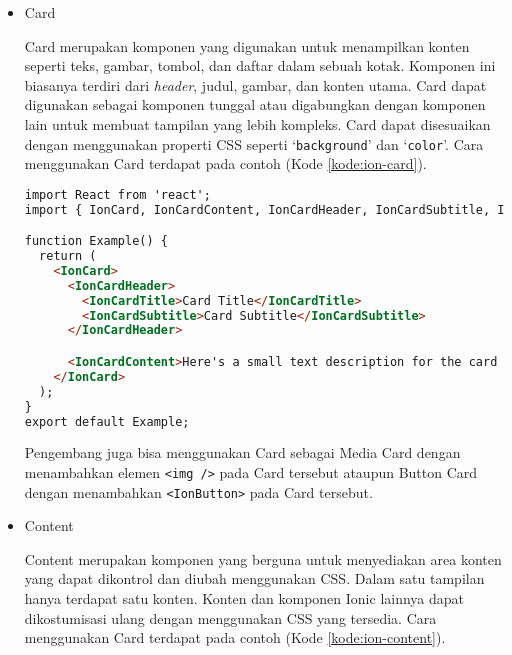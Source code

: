 \documentclass[a4paper,twoside]{article}
\begin{document}
\begin{enumerate}
\begin{itemize}
\begin{itemize}
\begin{lstlisting}[language=HTML, caption=Contoh Potongan Kode Button Menggunakan Icon, label=kode:ion-button-icon]
<IonButton>
    <IonIcon slot="start" icon={star}></IonIcon>
    Left Icon
</IonButton>
\end{lstlisting}

Nilai dari `slot' dapat berupa `\texttt{start}' untuk menempatkan ikon di awal Button, `\texttt{end}' untuk menempatkan ikon di akhir button, ataupun `\texttt{icon-only}' untuk memberikan ikon saja pada button.

        \item Card

        Card merupakan komponen yang digunakan untuk menampilkan konten seperti teks, gambar, tombol, dan daftar dalam sebuah kotak. Komponen ini biasanya terdiri dari \textit{header}, judul, gambar, dan konten utama. Card dapat digunakan sebagai komponen tunggal atau digabungkan dengan komponen lain untuk membuat tampilan yang lebih kompleks. Card dapat disesuaikan dengan menggunakan properti CSS seperti `\texttt{background}' dan `\texttt{color}'. Cara menggunakan Card terdapat pada contoh (Kode \ref{kode:ion-card}).

\begin{lstlisting}[language=HTML, caption=Contoh Potongan Kode Card, label=kode:ion-card, breaklines=true]
import React from 'react';
import { IonCard, IonCardContent, IonCardHeader, IonCardSubtitle, IonCardTitle } from '@ionic/react';

function Example() {
  return (
    <IonCard>
      <IonCardHeader>
        <IonCardTitle>Card Title</IonCardTitle>
        <IonCardSubtitle>Card Subtitle</IonCardSubtitle>
      </IonCardHeader>

      <IonCardContent>Here's a small text description for the card content. Nothing more, nothing less.</IonCardContent>
    </IonCard>
  );
}
export default Example;
\end{lstlisting}

Pengembang juga bisa menggunakan Card sebagai Media Card dengan menambahkan elemen \texttt{<img />} pada Card tersebut ataupun Button Card dengan menambahkan \texttt{<IonButton>} pada Card tersebut.

    \item Content

    Content merupakan komponen yang berguna untuk menyediakan area konten yang dapat dikontrol dan diubah menggunakan CSS. Dalam satu tampilan hanya terdapat satu konten. Konten dan komponen Ionic lainnya dapat dikostumisasi ulang dengan menggunakan CSS yang tersedia. Cara menggunakan Card terdapat pada contoh (Kode \ref{kode:ion-content}).


\end{itemize}
\end{itemize}
\end{enumerate}
\end{document}
